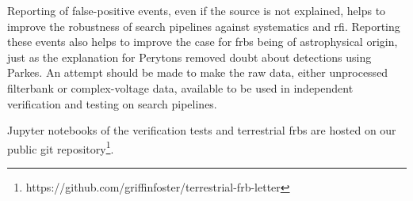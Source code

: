 \documentclass[a4paper,fleqn,usenatbib]{mnras}
\begin{document}
Reporting of false-positive events, even if the source is not explained, helps
to improve the robustness of search pipelines against systematics and \gls{rfi}.
Reporting these events also helps to improve the case for \glspl{frb} being of
astrophysical origin, just as the explanation for Perytons
\citep{2015MNRAS.451.3933P} removed doubt about detections using Parkes. An
attempt should be made to make the raw data, either unprocessed filterbank or
complex-voltage data, available to be used in independent verification and
testing on search pipelines.

Jupyter notebooks of the verification tests and terrestrial \glspl{frb} are
hosted on our public git
repository\footnote{https://github.com/griffinfoster/terrestrial-frb-letter}.



%
\end{document}
